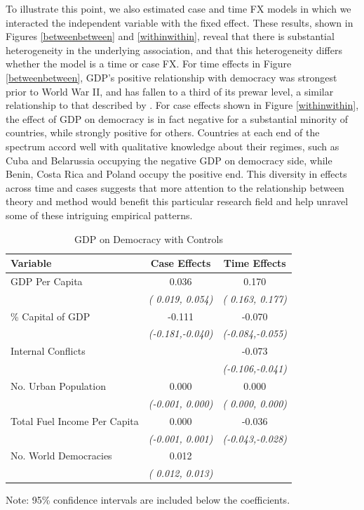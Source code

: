 \documentclass{article}[12pt]
\begin{document}
To illustrate this point, we also estimated case and time FX models in which we interacted the independent variable with the fixed effect. These results, shown in Figures \ref{betweenbetween} and \ref{withinwithin}, reveal that there is substantial heterogeneity in the underlying association, and that this heterogeneity differs whether the model is a time or case FX. For time effects in Figure \ref{betweenbetween}, GDP's positive relationship with democracy was strongest prior to World War II, and has fallen to a third of its prewar level, a similar relationship to that described by \textcite{Boix2012}. For case effects shown in Figure \ref{withinwithin}, the effect of GDP on democracy is in fact negative for a substantial minority of countries, while strongly positive for others. Countries at each end of the spectrum accord well with qualitative knowledge about their regimes, such as Cuba and Belarussia occupying the negative GDP on democracy side, while Benin, Costa Rica and Poland occupy the positive end. This diversity in effects across time and cases suggests that more attention to the relationship between theory and method would benefit this particular research field and help unravel some of these intriguing empirical patterns.

\begin{table}[ht]
	\centering
	\begin{tabular}{lcc}
		
		Variable & Case Effects & Time Effects \\
		\midrule
		GDP Per Capita &  0.036 &  0.170 \\ 
		& \emph{( 0.019, 0.054)} & \emph{( 0.163, 0.177)} \\[1em]
		\% Capital of GDP & -0.111 & -0.070 \\ 
		& \emph{(-0.181,-0.040)} & \emph{(-0.084,-0.055)} \\[1em] 
		Internal Conflicts &  & -0.073 \\
		&  & \emph{(-0.106,-0.041)} \\[1em] 
		No. Urban Population &  0.000 &  0.000 \\ 
		& \emph{(-0.001, 0.000)} & \emph{( 0.000, 0.000)} \\[1em] 
		Total Fuel Income Per Capita &  0.000 & -0.036 \\ 
		& \emph{(-0.001, 0.001)} & \emph{(-0.043,-0.028)} \\[1em] 
		No. World Democracies &  0.012 &  \\ 
		& \emph{( 0.012, 0.013)} &  \\[1em]
		
	\end{tabular}
	\caption{GDP on Democracy with Controls} 
	\label{gdpcontrols}
	{\scriptsize Note: 95\% confidence intervals are included below the coefficients.}
\end{table}
\end{document}
